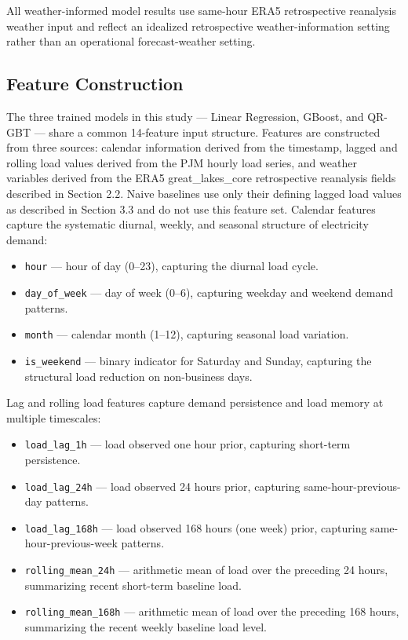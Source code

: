 \documentclass[12pt,a4paper]{article}
\begin{document}
All weather-informed model results use same-hour ERA5 retrospective reanalysis weather input and reflect an idealized retrospective weather-information setting rather than an operational forecast-weather setting.


\subsection{Feature Construction}
The three trained models in this study --- Linear Regression, GBoost, and QR-GBT --- share a common 14-feature input structure. Features are constructed from three sources: calendar information derived from the timestamp, lagged and rolling load values derived from the PJM hourly load series, and weather variables derived from the ERA5 great\_lakes\_core retrospective reanalysis fields described in Section 2.2. Naive baselines use only their defining lagged load values as described in Section 3.3 and do not use this feature set.
Calendar features capture the systematic diurnal, weekly, and seasonal structure of electricity demand:

\begin{itemize}[leftmargin=*, itemsep=2pt]
    \item \texttt{hour} --- hour of day (0--23), capturing the diurnal load cycle.
    \item \texttt{day\_of\_week} --- day of week (0--6), capturing weekday and weekend demand patterns.
    \item \texttt{month} --- calendar month (1--12), capturing seasonal load variation.
    \item \texttt{is\_weekend} --- binary indicator for Saturday and Sunday, capturing the structural load reduction on non-business days.
\end{itemize}


Lag and rolling load features capture demand persistence and load memory at multiple timescales:

\begin{itemize}[leftmargin=*, itemsep=2pt]
    \item \texttt{load\_lag\_1h} --- load observed one hour prior, capturing short-term persistence.
    \item \texttt{load\_lag\_24h} --- load observed 24 hours prior, capturing same-hour-previous-day patterns.
    \item \texttt{load\_lag\_168h} --- load observed 168 hours (one week) prior, capturing same-hour-previous-week patterns.
    \item \texttt{rolling\_mean\_24h} --- arithmetic mean of load over the preceding 24 hours, summarizing recent short-term baseline load.
    \item \texttt{rolling\_mean\_168h} --- arithmetic mean of load over the preceding 168 hours, summarizing the recent weekly baseline load level.
\end{itemize}
\end{document}
